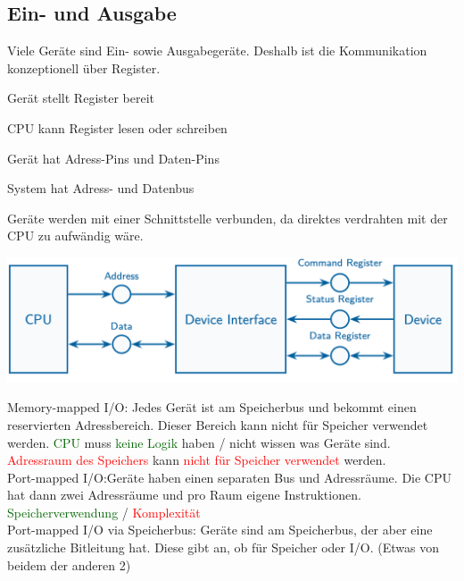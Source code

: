 \documentclass[8pt,landscape,a4paper]{scrartcl}
\begin{document}
\begin{multicols*}{5}



\section{Ein- und Ausgabe}
Viele Geräte sind Ein- sowie Ausgabegeräte. Deshalb ist die Kommunikation konzeptionell über Register. 
\begin{compactitem}[$\bullet$]
	\item Gerät stellt Register bereit
	\item CPU kann Register lesen oder schreiben
	\item Gerät hat Adress-Pins und Daten-Pins
	\item System hat Adress- und Datenbus
\end{compactitem}
Geräte werden mit einer Schnittstelle verbunden, da direktes verdrahten mit der CPU zu aufwändig wäre.\vspace{-7pt}
\begin{center}
	\includegraphics[scale=.25]{Graphic/EinAus}
	\vspace{-10pt}
\end{center}
\textcolor{b}{Memory-mapped I/O}: Jedes Gerät ist am Speicherbus und bekommt einen reservierten Adressbereich. Dieser Bereich kann nicht für Speicher verwendet werden. \textcolor{darkgreen}{CPU} muss \textcolor{darkgreen}{keine Logik} haben / nicht wissen was Geräte sind. \textcolor{red}{Adressraum des Speichers} kann \textcolor{red}{nicht für Speicher verwendet} werden. \\
\textcolor{b}{Port-mapped I/O}:Geräte haben einen separaten Bus und Adressräume. Die CPU hat dann zwei Adressräume und pro Raum eigene Instruktionen. \textcolor{darkgreen}{Speicherverwendung} / \textcolor{red}{Komplexität}\\
\textcolor{b}{Port-mapped I/O via Speicherbus}: Geräte sind am Speicherbus, der aber eine zusätzliche Bitleitung hat. Diese gibt an, ob für Speicher oder I/O. (Etwas von beidem der anderen 2)

\end{multicols*}
\end{document}

